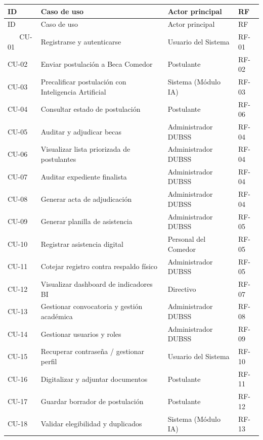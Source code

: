 \begin{longtable}{>{\raggedright\arraybackslash}p{1.4cm} >{\raggedright\arraybackslash}p{6.4cm} >{\raggedright\arraybackslash}p{3.2cm} >{\raggedright\arraybackslash}p{1.5cm}}
\toprule
ID & Caso de uso & Actor principal & RF \\
\midrule
\endfirsthead
\toprule
ID & Caso de uso & Actor principal & RF \\
\midrule
\endhead
\midrule
\multicolumn{4}{r}{\textit{Continúa en la siguiente página}} \
\endfoot
\bottomrule
\multicolumn{4}{l}{\textit{Nota.} Elaboración propia.} \
\endlastfoot
CU-01 & Registrarse y autenticarse & Usuario del Sistema & RF-01 \\
CU-02 & Enviar postulación a Beca Comedor & Postulante & RF-02 \\
CU-03 & Precalificar postulación con Inteligencia Artificial & Sistema (Módulo IA) & RF-03 \\
CU-04 & Consultar estado de postulación & Postulante & RF-06 \\
CU-05 & Auditar y adjudicar becas & Administrador DUBSS & RF-04 \\
CU-06 & Visualizar lista priorizada de postulantes & Administrador DUBSS & RF-04 \\
CU-07 & Auditar expediente finalista & Administrador DUBSS & RF-04 \\
CU-08 & Generar acta de adjudicación & Administrador DUBSS & RF-04 \\
CU-09 & Generar planilla de asistencia & Administrador DUBSS & RF-05 \\
CU-10 & Registrar asistencia digital & Personal del Comedor & RF-05 \\
CU-11 & Cotejar registro contra respaldo físico & Administrador DUBSS & RF-05 \\
CU-12 & Visualizar dashboard de indicadores BI & Directivo & RF-07 \\
CU-13 & Gestionar convocatoria y gestión académica & Administrador DUBSS & RF-08 \\
CU-14 & Gestionar usuarios y roles & Administrador DUBSS & RF-09 \\
CU-15 & Recuperar contraseña / gestionar perfil & Usuario del Sistema & RF-10 \\
CU-16 & Digitalizar y adjuntar documentos & Postulante & RF-11 \\
CU-17 & Guardar borrador de postulación & Postulante & RF-12 \\
CU-18 & Validar elegibilidad y duplicados & Sistema (Módulo IA) & RF-13 \\

\end{longtable}

